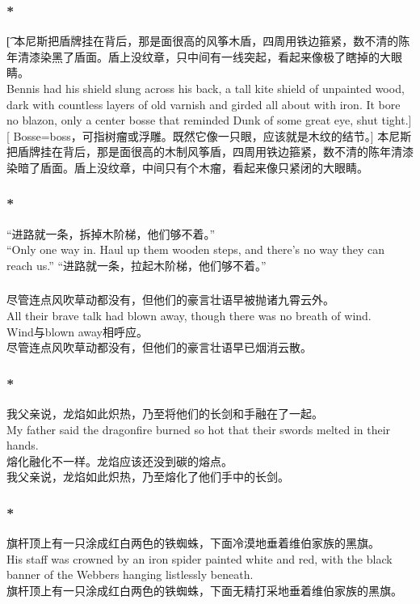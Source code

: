 \documentclass[12pt,a4paper]{article}
\newcommand{\h}[1]{{\color{red}#1}\\}
\newcommand{\la}[1]{{\color{blue}#1}\\}
\begin{document}
\subsubsection{\color{red}*}\t[	
	本尼斯把盾牌挂在背后，那是面很高的风筝木盾，四周用铁边箍紧，数不清的陈年清漆染黑了盾面。盾上没纹章，只中间有一线突起，看起来像极了瞎掉的大眼睛。\\
	Bennis had his shield slung across his back, a tall kite shield of unpainted wood, dark with countless layers of old varnish and girded all about with iron. It bore no blazon, only a center bosse that reminded Dunk of some great eye, shut tight.][
	Bosse=boss，可指树瘤或浮雕。既然它像一只眼，应该就是木纹的结节。]
	本尼斯把盾牌挂在背后，那是面很高的木制风筝盾，四周用铁边箍紧，数不清的陈年清漆染暗了盾面。盾上没纹章，中间只有个木瘤，看起来像只紧闭的大眼睛。
	
\subsubsection{\color{red}*}\color{blue}
	“进路就一条，拆掉木阶梯，他们够不着。”\\
	“Only one way in. Haul up them wooden steps, and there's no way they can reach us.”\color{black}
“进路就一条，拉起木阶梯，他们够不着。”
	
\subsubsection{}\la{
	 尽管连点风吹草动都没有，但他们的豪言壮语早被抛诸九霄云外。\\
	 All their brave talk had blown away, though there was no breath of wind. }\h{
	 Wind与blown away相呼应。}
	 尽管连点风吹草动都没有，但他们的豪言壮语早已烟消云散。
	 
\subsubsection{\color{red}*}\la{	
	 我父亲说，龙焰如此炽热，乃至将他们的长剑和手融在了一起。\\
	 My father said the dragonfire burned so hot that their swords melted in their hands.}\h{
	 熔化融化不一样。龙焰应该还没到碳的熔点。}
	 我父亲说，龙焰如此炽热，乃至熔化了他们手中的长剑。
	 
	 
\subsubsection{\color{red}*}\la{
	 旗杆顶上有一只涂成红白两色的铁蜘蛛，下面冷漠地垂着维伯家族的黑旗。\\
	 His staff was crowned by an iron spider painted white and red, with the black banner of the Webbers hanging listlessly beneath.}
	 旗杆顶上有一只涂成红白两色的铁蜘蛛，下面无精打采地垂着维伯家族的黑旗。
	 
\end{document}
